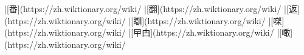 |[番](https://zh.wiktionary.org/wiki/%
|[翻](https://zh.wiktionary.org/wiki/%
|[返](https://zh.wiktionary.org/wiki/%
|[瞓](https://zh.wiktionary.org/wiki/%
|[㗎](https://zh.wiktionary.org/wiki/%
|[曱甴](https://zh.wiktionary.org/wiki/%
|[噉](https://zh.wiktionary.org/wiki/%
